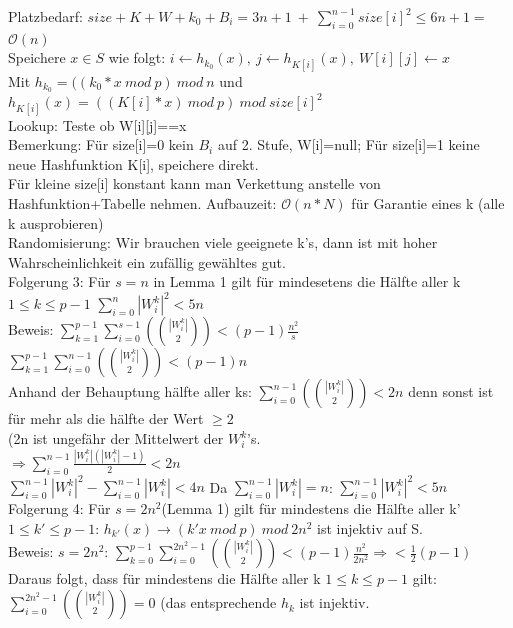 \documentclass[a4paper]{article}
\newcommand{\oh}[1]{$\mathcal{O}(#1)$}
\begin{document}
Platzbedarf: $size+K+W+k_0+B_i = 3n+1\ +\ \sum_{i=0}^{n-1} size[i]^2 \leq 6n+1 =$\oh{n}\\
Speichere $x\in S$ wie folgt: $i\leftarrow h_{k_0}(x),\ j\leftarrow h_{K[i]}(x),\ W[i][j] \leftarrow x$\\
Mit $h_{k_0} = ((k_0*x\ mod\ p)\ mod\ n$ und $h_{K[i]}(x) = ((K[i] * x)\ mod\ p)\ mod\ size[i]^2$\\
Lookup: Teste ob W[i][j]==x\\
Bemerkung: Für size[i]=0 kein $B_i$ auf 2. Stufe, W[i]=null; Für size[i]=1 keine neue Hashfunktion K[i], speichere direkt.\\
\hspace*{1cm} Für kleine size[i] konstant kann man Verkettung anstelle von Hashfunktion+Tabelle nehmen.
Aufbauzeit: \oh{n*N} für Garantie eines k (alle k ausprobieren)\\
Randomisierung: Wir brauchen viele geeignete k's, dann ist mit hoher Wahrscheinlichkeit ein zufällig gewähltes gut.\\
Folgerung 3: Für $s=n$ in Lemma 1 gilt für mindesetens die Hälfte aller k $1\leq k\leq p-1$ $\sum_{i=0}^n |W_i^k|^2 < 5n$\\
Beweis: $\sum_{k=1}^{p-1}\sum_{i=0}^{s-1}({|W_i^k| \choose 2}) < (p-1)\frac{n^2}{s}$\\
$\sum_{k=1}^{p-1}\sum_{i=0}^{n-1}({|W_i^k| \choose 2}) <(p-1)n$\\
Anhand der Behauptung hälfte aller ks: $\sum_{i=0}^{n-1}({|W_i^k|\choose 2}) < 2n$ denn sonst ist für mehr als die hälfte der Wert $\geq 2$\\
(2n ist ungefähr der Mittelwert der $W_i^k$'s.\\
$\Rightarrow \sum_{i=0}^{n-1} \frac{|W_i^k|(|W_i^k|-1)}{2}<2n$\\
\hspace*{1cm}$\sum_{i=0}^{n-1} |W_i^k|^2 - \sum_{i=0}^{n-1} |W_i^k| < 4n$
Da $\sum_{i=0}^{n-1} |W_i^k| = n$: $\sum_{i=0}^{n-1} |W_i^k|^2<5n$\\
Folgerung 4: Für $s=2n^2$(Lemma 1) gilt für mindestens die Hälfte aller k' $1\leq k'\leq p-1$: $h_{k'}(x)\rightarrow (k'x\ mod\ p)\ mod\ 2n^2$ ist injektiv auf S.\\
Beweis: $s=2n^2$: $\sum_{k=0}^{p-1}\sum_{i=0}^{2n^2-1} ({|W_i^k| \choose 2}) < (p-1) \frac{n^2}{2n^2} \Rightarrow <\frac{1}{2}(p-1)$\\
Daraus folgt, dass für mindestens die Hälfte aller k $1\leq k\leq p-1$ gilt: $\sum_{i=0}^{2n^2-1}({ |W_i^k| \choose 2}) = 0$ (das entsprechende $h_k$ ist injektiv.\\
\end{document}
